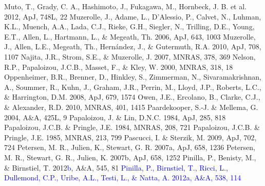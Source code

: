 \documentclass[apj]{emulateapj}
\def\blue#1{\textcolor{blue}{#1}}
\begin{document}
\begin{thebibliography}{}
 Muto, T., Grady, C. A., Hashimoto, J., Fukagawa, M., Hornbeck, J. B. et al. 2012, ApJ, 748L, 22
 Muzerolle, J., Adame, L., D'Alessio, P., Calvet, N., Luhman, K.L., Muench, A.A., Lada, C.J., Rieke, G.H., Siegler, N., Trilling, D.E., Young, E.T., Allen, L., Hartmann, L., \& Megeath, Th. 2006, ApJ, 643, 1003
 Muzerolle, J., Allen, L.E., Megeath, Th., Hern\'andez, J., \& Gutermuth, R.A. 2010, ApJ, 708, 1107
 Najita, J.R., Strom, S.E., \& Muzerolle, J. 2007, MNRAS, 378, 369
 Nelson, R.P., Papaloizou, J.C.B., Masset, F., \& Kley, W. 2000, MNRAS, 318, 18
 Oppenheimer, B.R., Brenner, D., Hinkley, S., Zimmerman, N., Sivaramakrishnan, A., Soummer, R., Kuhn, J., Graham, J.R., Perrin, M., Lloyd, J.P., Roberts, L.C., \& Harrington, D.M. 2008, ApJ, 679, 1574
 Owen, J.E., Ercolano, B., Clarke, C.J., \& Alexander, R.D. 2010, MNRAS, 401, 1415
 Paardekooper, S.-J. \& Mellema, G.	2004, A\&A, 425L, 9
 Papaloizou, J. \& Lin, D.N.C. 1984, ApJ, 285, 818
 Papaloizou, J.C.B. \& Pringle, J.E. 1984, MNRAS, 208, 721
 Papaloizou, J.C.B. \& Pringle, J.E. 1985, MNRAS, 213, 799
 Pascucci, I. \& Sterzik, M. 2009, ApJ, 702, 724
 Petersen, M. R., Julien, K., Stewart, G. R. 2007a, ApJ, 658, 1236
 Petersen, M. R., Stewart, G. R., Julien, K. 2007b, ApJ, 658, 1252
 Pinilla, P., Benisty, M., \& Birnstiel, T. 2012\blue{b}, A\&A, 545, 81
\bibitem[{{\blue{Pinilla et al.}}(2012a)}]{Pinilla12a} \blue{Pinilla, P., Birnstiel, T., Ricci, L., Dullemond, C.P., Uribe, A.L., Testi, L., \& Natta, A. 2012a, A\&A, 538, 114} 

\end{thebibliography}
\end{document}
